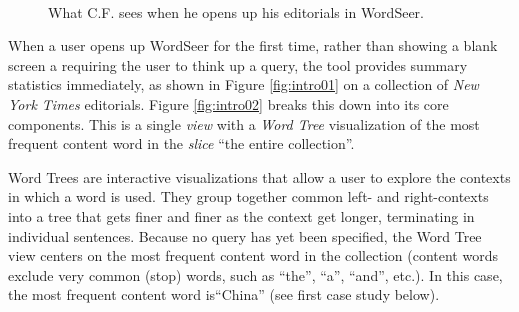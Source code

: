 \documentclass{sig-alternate}
\begin{document}
\begin{figure}[ht!]
\begin{center}
%
        \\
%
    \end{center}
    \caption{%
        What C.F. sees when he opens up his editorials in WordSeer.
     }%
\end{figure}

When a user opens up WordSeer for the first time, rather than showing a blank screen a requiring the user to think up a query, the tool  provides summary statistics immediately, as shown in Figure \ref{fig:intro01} on a collection of \emph{New York Times} editorials.  Figure \ref{fig:intro02} breaks this down into its core components. This is a single \emph{view} with a \emph{Word Tree} visualization of the most frequent content word in the \emph{slice} ``the entire collection''. 

Word Trees \cite{wattenberg_word_2008} are interactive visualizations that allow a user to explore the contexts in which a word is used. They group together common left- and right-contexts into a tree that gets finer and finer as the context get longer, terminating in individual sentences.  Because no query has yet been specified, the Word Tree view centers on the most frequent content word in the collection (content words exclude very common (stop) words, such as ``the'', ``a'', ``and'', etc.). In this case, the most frequent content word is``China'' (see first case study below).
\end{document}
